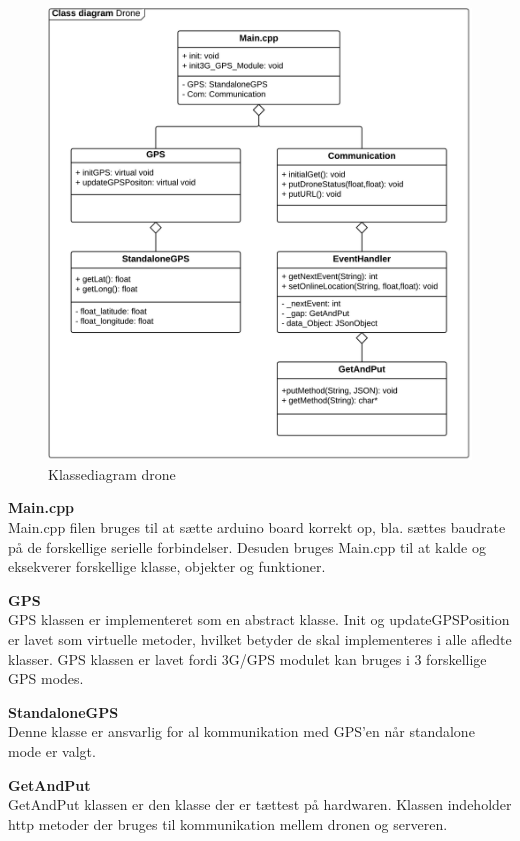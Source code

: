 \begin{figure}[H]
	\centering
	\includegraphics[width=1\textwidth]{Billeder/klasse_diagrammer/classdiagram_iteration1.png}
	\vspace{-0.5cm}
	\caption{Klassediagram drone}
	\label{fig:classDiagram_iteration1}
\end{figure}

\newpage

\textbf{Main.cpp} \\
Main.cpp filen bruges til at sætte arduino board korrekt op, bla. sættes baudrate på de forskellige serielle forbindelser. Desuden bruges Main.cpp til at kalde og eksekverer forskellige klasse, objekter og funktioner.

\textbf{GPS} \\
GPS klassen er implementeret som en abstract klasse. Init og updateGPSPosition er lavet som virtuelle metoder, hvilket betyder de skal implementeres i alle afledte klasser. GPS klassen er lavet fordi 3G/GPS modulet kan bruges i 3 forskellige GPS modes. 

\textbf{StandaloneGPS}\\
Denne klasse er ansvarlig for al kommunikation med GPS'en når standalone mode er valgt. 

\textbf{GetAndPut} \\
GetAndPut klassen er den klasse der er tættest på hardwaren. Klassen indeholder http metoder der bruges til kommunikation mellem dronen og serveren. 

